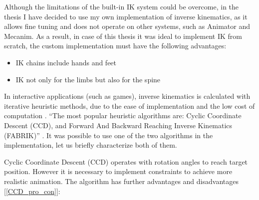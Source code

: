 \documentclass[a4paper]{report}
\begin{document}
Although the limitations of the built-in IK system could be overcome, in the thesis I have decided to use my own implementation of inverse kinematics, as it allows fine tuning and does not operate on other systems, such as Animator and Mecanim. As a result, in case of this thesis it was ideal to implement IK from scratch, the custom implementation must have the following advantages: 
\begin{itemize}
\item IK chains include hands and feet
\item IK not only for the limbs but also for the spine 
\end{itemize}


\bigskip In interactive applications (such as games), inverse kinematics is calculated with iterative heuristic methods, due to the ease of implementation and the low cost of computation \cite{IKtechniques}.
“The most popular heuristic algorithms are: Cyclic Coordinate Descent (CCD), and Forward And Backward Reaching Inverse Kinematics (FABRIK)” \cite{wikipediaIK}.
It was possible to use one of the two algorithms in the implementation, let us briefly characterize both of them.

\bigskip Cyclic Coordinate Descent (CCD) operates with rotation angles to reach target position.  However it is necessary to implement constraints to achieve more realistic animation. The algorithm has further advantages and disadvantages [\ref{CCD_pro_con}]:
\end{document}
